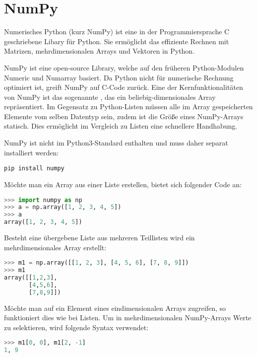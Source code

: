 \section{NumPy}\label{k4.2.ch.NumPy}

Numerisches Python (kurz NumPy) ist eine in der Programmiersprache C geschriebene Libary für Python. Sie ermöglicht das effiziente Rechnen mit Matrizen, mehrdimensionalen Arrays und Vektoren in Python.

NumPy ist eine open-source Library, welche auf den früheren Python-Modulen Numeric und Numarray basiert. Da Python nicht für numerische Rechnung optimiert ist, greift NumPy auf C-Code zurück. Eine der Kernfunktionalitäten von NumPy ist das sogenannte , das ein beliebig-dimensionales Array repräsentiert. Im Gegensatz zu Python-Listen müssen alle im Array gespeicherten Elemente vom selben Datentyp sein, zudem ist die Größe eines NumPy-Arrays statisch. Dies ermöglicht im Vergleich zu Listen eine schnellere Handhabung.

NumPy ist nicht im Python3-Standard enthalten und muss daher separat installiert werden:

\begin{lstlisting}
pip install numpy
\end{lstlisting}

Möchte man ein Array aus einer Liste erstellen, bietet sich folgender Code an:

\begin{lstlisting}[language=python]
>>> import numpy as np
>>> a = np.array([1, 2, 3, 4, 5])
>>> a
array([1, 2, 3, 4, 5])
\end{lstlisting}

Besteht eine übergebene Liste aus mehreren Teillisten wird ein mehrdimensionales Array erstellt:

\begin{lstlisting}[language=python]
>>> m1 = np.array([[1, 2, 3], [4, 5, 6], [7, 8, 9]])
>>> m1
array([[1,2,3],
       [4,5,6],
       [7,8,9]])
\end{lstlisting}

Möchte man auf ein Element eines eindimensionalen Arrays zugreifen, so funktioniert dies wie bei Listen. Um in mehrdimensionalen NumPy-Arrays Werte zu selektieren, wird folgende Syntax verwendet:

\begin{lstlisting}[language=python]
>>> m1[0, 0], m1[2, -1]
1, 9
\end{lstlisting}

